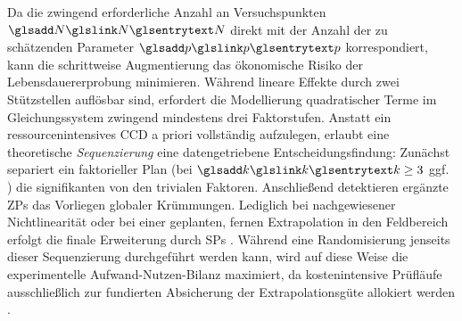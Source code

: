Da die zwingend erforderliche Anzahl an Versuchspunkten $\sym{N}$ direkt mit der Anzahl der zu schätzenden Parameter $\sym{p}$ \cite{Russell.2019} korrespondiert, kann die schrittweise Augmentierung das ökonomische Risiko der Lebensdauererprobung minimieren.
Während lineare Effekte durch zwei Stützstellen auflösbar sind, erfordert die Modellierung quadratischer Terme im Gleichungssystem zwingend mindestens drei Faktorstufen.
Anstatt ein ressourcenintensives \ac{CCD} a priori vollständig aufzulegen, erlaubt eine theoretische \textit{Sequenzierung} eine datengetriebene  Entscheidungsfindung:
Zunächst separiert ein faktorieller Plan (bei $\sym{k} \ge 3$ ggf. ) die signifikanten von den trivialen Faktoren.
Anschließend detektieren ergänzte \acp{ZP} das Vorliegen globaler Krümmungen.
Lediglich bei nachgewiesener Nichtlinearität oder bei einer geplanten, fernen Extrapolation in den Feldbereich erfolgt die finale Erweiterung durch \acp{SP} \cite{Paschal.2024, Pukelsheim.2006}.
Während eine Randomisierung jenseits dieser Sequenzierung durchgeführt werden kann, wird auf diese Weise die experimentelle Aufwand-Nutzen-Bilanz maximiert, da kostenintensive Prüfläufe ausschließlich zur fundierten Absicherung der Extrapolationsgüte allokiert werden \cite{Myers.2016,Montgomery.2020,RisbergEllekjr.1998}.


